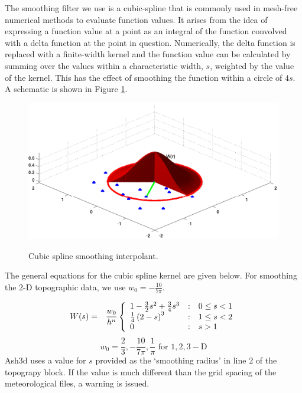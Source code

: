 The smoothing filter we use is a cubic-spline that is commonly used in mesh-free numerical
methods to evaluate function values. It arises from the idea of expressing a function
value at a point as an integral of the function convolved with a delta function at the point
in question. Numerically, the delta function is replaced with a finite-width kernel and
the function value can be calculated by summing over the values within a
characteristic width, $s$, weighted by the value of the kernel. This has the effect of
smoothing the function within a circle of $4s$. A schematic is shown in Figure \ref{FigTopo_kernel}.

\begin{figure}[htbp]\vspace*{0cm}\hspace*{0cm}
\includegraphics[angle=0,scale=0.4]{Figures/Apx_Topo/AGU_kernal.pdf}\\
\parbox{15cm}{\caption{\label{FigTopo_kernel}
Cubic spline smoothing interpolant.
}}
\end{figure}

The general equations for the cubic spline kernel are given below. For smoothing
the 2-D topographic data, we use $w_0=-\frac{10}{7\pi}$.

\begin{eqnarray*}
W(s) &=& \frac{w_0}{h^n} \left\{ \begin{array}
{l@{\quad:\quad}l}
1-\frac{3}{2}s^2+\frac{3}{4}s^3
& 0\le s<1 \\
\frac{1}{4}\left(2-s\right)^3
& 1\le s<2 \\
0 & s>1
\end{array}
\right.\nonumber \\
\end{eqnarray*}
\[
w_0=\frac{2}{3},-\frac{10}{7\pi} ,\frac{1}{\pi} \,\, \mathrm{for} \,\, \mathrm{1,2,3-D}
\]
Ash3d uses a value for $s$ provided as the `smoothing radius' in line 2 of the
topograpy block. If the value is much different than the grid spacing of the
meteorological files, a warning is issued.

